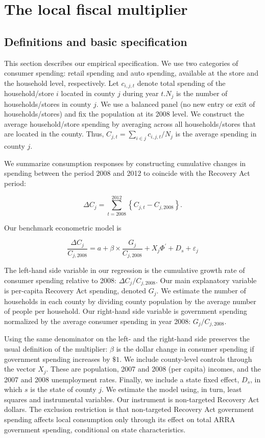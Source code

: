 \documentclass[\latexroot/\projectname]{subfiles}
\begin{document}
\section{The local fiscal multiplier}
\whenintegrated{\label{sec:empirics}}

\subsection{Definitions and basic specification}
This section describes our empirical specification. We use two categories of consumer spending: retail spending and auto spending, available at the store and the household level, respectively. Let $c_{i, j, t}$ denote total spending of the household/store $i$ located in county $j$ during year $t . N_{j}$ is the number of households/stores in county $j$. We use a balanced panel (no new entry or exit of households/stores) and fix the population at its 2008 level. We construct the average household/store spending by averaging across all households/stores that are located in the county. Thus, $C_{j, t}=\sum_{i \in j} c_{i, j, t} / N_{j}$ is the average spending in county $j$.

We summarize consumption responses by constructing cumulative changes in spending between the period 2008 and 2012 to coincide with the Recovery Act period:


\begin{equation*}
\Delta C_{j}=\sum_{t=2008}^{2012}\left\{C_{j, t}-C_{j, 2008}\right\} . \tag{3.1}
\end{equation*}


Our benchmark econometric model is


\begin{equation*}
\frac{\Delta C_{j}}{C_{j, 2008}}=a+\beta \times \frac{G_{j}}{C_{j, 2008}}+X_{j} \Phi^{\prime}+D_{s}+\varepsilon_{j} \tag{3.2}
\end{equation*}


The left-hand side variable in our regression is the cumulative growth rate of consumer spending relative to 2008: $\Delta C_{j} / C_{j, 2008}$. Our main explanatory variable is per-capita Recovery Act spending, denoted $G_{j}$. We estimate the number of households in each county by dividing county population by the average number of people per household. Our right-hand side variable is government spending normalized by the average consumer spending in year 2008: $G_{j} / C_{j, 2008}$.

Using the same denominator on the left- and the right-hand side preserves the usual definition of the multiplier: $\beta$ is the dollar change in consumer spending if government spending increases by $\$ 1$. We include county-level controls through the vector $X_{j}$. These are population, 2007 and 2008 (per capita) incomes, and the 2007 and 2008 unemployment rates. Finally, we include a state fixed effect, $D_{s}$, in which $s$ is the state of county $j$. We estimate the model using, in turn, least squares and instrumental variables. Our instrument is non-targeted Recovery Act dollars. The exclusion restriction is that non-targeted Recovery Act government spending affects local consumption only through its effect on total ARRA government spending, conditional on state characteristics.
\end{document}
